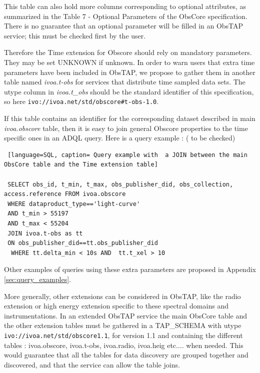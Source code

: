 \documentclass[11pt,a4paper]{ivoa}
\begin{document}
 This table can also hold more columns corresponding to  optional attributes, as summarized in the Table 7 - Optional Parameters  of the ObsCore specification.
 There is no guarantee that an optional parameter will be filled in an ObsTAP service; this must be checked first by the user. 
 
 Therefore the Time extension for Obscore should rely on mandatory parameters. 
 They may be set UNKNOWN if unknown.
 In order to warn users that extra time parameters have been included in ObsTAP, we propose to gather them  in another table named \emph{ivoa.t-obs}
 for services that distribute time sampled data sets. 
 The utype column in  \emph{ivoa.t\_obs} should be the standard identifier of this specification, so here \texttt{ivo://ivoa.net/std/obscore\#t-obs-1.0}.

 If this table contains an identifier for the corresponding dataset described in main \emph{ivoa.obscore} table, then it is easy to join  general Obscore properties to the time specific ones in an ADQL query.
 Here is a query  example :  ( to be checked) 
 \begin{lstlisting} [language=SQL, caption= Query example with  a JOIN between the main ObsCore table and the Time extension table]

 SELECT obs_id, t_min, t_max, obs_publisher_did, obs_collection, access.reference FROM ivoa.obscore 
 WHERE dataproduct_type=='light-curve'
 AND t_min > 55197 
 AND t_max < 55204
 JOIN ivoa.t-obs as tt
 ON obs_publisher_did==tt.obs_publisher_did
  WHERE tt.delta_min < 10s AND  tt.t_xel > 10
 \end{lstlisting}

Other examples of queries using these extra parameters are proposed in Appendix \ref{sec:query_examples}.

More generally, other extensions can be considered in ObsTAP, like the radio extension or high energy extension specific to these spectral domains and instrumentations. 
In an extended ObsTAP service the main ObsCore table and the other extension tables must be gathered in a TAP\_SCHEMA with utype \\ \texttt{ivo://ivoa.net/std/obscore1.1}, for version 1.1 and containing the different tables : ivoa.obscore, ivoa.t-obs, ivoa.radio, ivoa.heig etc.... when needed. 
This would guarantee that all the tables for data discovery are grouped together and discovered, and that the service can allow the table joins.

\end{document}
